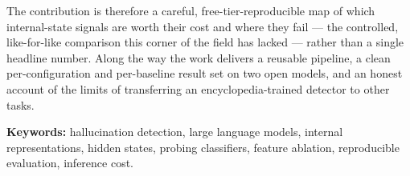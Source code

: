 The contribution is therefore a careful, free-tier-reproducible map of which internal-state
signals are worth their cost and where they fail --- the controlled, like-for-like comparison
this corner of the field has lacked --- rather than a single headline number. Along the way
the work delivers a reusable pipeline, a clean per-configuration and per-baseline result set
on two open models, and an honest account of the limits of transferring an
encyclopedia-trained detector to other tasks.

\vspace{0.4cm}
\noindent\textbf{Keywords:} hallucination detection, large language models, internal
representations, hidden states, probing classifiers, feature ablation, reproducible
evaluation, inference cost.
